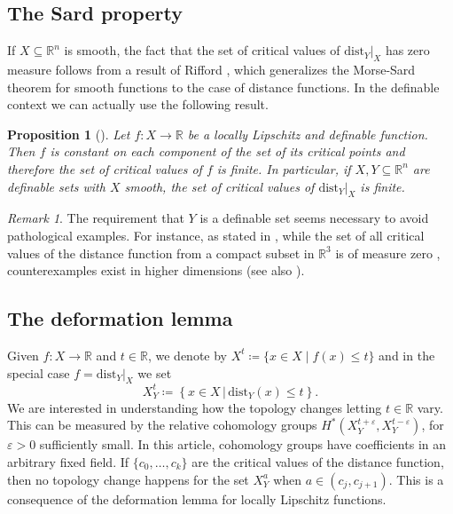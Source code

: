 \documentclass{amsart}
\newcommand{\R}{\mathbb{R}}
\newcommand{\dd}{\mathrm{dist}}
\newcommand{\dist}{{\mathrm{dist}_Y|_X}}
\newtheorem{proposition}[subsubsection]{Proposition}
\theoremstyle{definition}
\theoremstyle{remark}
\newtheorem{remark}[subsubsection]{Remark}
\begin{document}
\subsection{The Sard property}\label{sec:sard}

If $X \subseteq \R^n$ is smooth, the fact that the set of critical values of $\dist$ has zero measure  follows from a result of Rifford \cite{Rifford2004}, which generalizes the Morse-Sard theorem for smooth functions to the case of distance functions. In the definable context we can actually use the following result.

\begin{proposition}[{\cite[Theorem 7]{BDLS2005}}]
\label{propo:crit_values_definable}
Let $f \colon X\to \R$ be a locally Lipschitz and definable function. Then $f$ is constant on each component of the set of its critical points and therefore the set of critical values of $f$ is finite. In particular, if $X, Y \subseteq \R^n$ are definable sets with $X$ smooth, the set of critical values of $\dist$ is finite.
\end{proposition}

\begin{remark}\label{remark:needed}
The requirement that $Y$ is a definable set seems necessary to avoid pathological examples. For instance, as stated in \cite[Remark 1.1]{Rifford2004}, while the set of all critical values of the distance function from a compact subset in $\R^3$ is of measure zero \cite{Fu1985}, counterexamples exist in higher dimensions \cite[Example 3]{Ferry1976} (see also \cite{Whitney1935}).
\end{remark}

\subsection{The deformation lemma}

Given $f \colon X \to \R$ and $t \in \R$, we denote by $X^t \coloneqq \{x\in X \mid f(x) \leq t\}$ and in the special case $f = \dist$ we set 
\[
X_Y^{t} \coloneqq \left\{x \in X \,\bigg|\, \dd_Y(x) \leq t\right\}.
\]
We are interested in understanding how the topology changes letting $t \in \R$ vary. This can be measured by the relative cohomology groups $H^*(X_Y^{t + \varepsilon}, X_Y^{t - \varepsilon})$, for $\varepsilon > 0$ sufficiently small. In this article, cohomology groups have coefficients in an arbitrary fixed field.
If  $\{c_0, \ldots, c_k\}$ are the critical values of the distance function, then no topology change happens for the set $X_Y^a$ when $a \in (c_j, c_{j+1})$. This is a consequence of the deformation lemma for locally Lipschitz functions.
\end{document}
